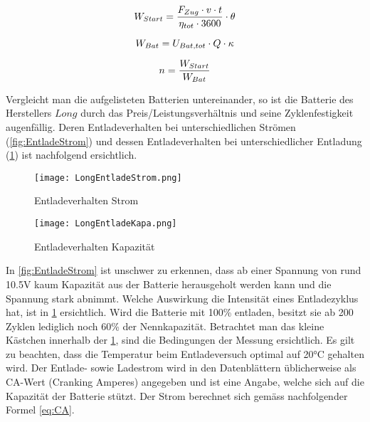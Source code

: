 \begin{equation}
\centering
	W_{Start}=\frac{F_{Zug}\cdot v \cdot t}{\eta_{tot}\cdot 3600}\cdot \theta
\label{eq:EnergieStart}
\end{equation}

\begin{equation}
\centering
	W_{Bat}=U_{Bat,tot}\cdot Q \cdot \kappa
\label{eq:EnergieBatterie}
\end{equation}

\begin{equation}
\centering
	n=\frac{W_{Start}}{W_{Bat}}
\label{eq:AnzahlStarts}
\end{equation}


Vergleicht man die aufgelisteten Batterien untereinander, so ist die Batterie des Herstellers $Long$ durch das Preis/Leistungsverhältnis und seine Zyklenfestigkeit augenfällig. Deren Entladeverhalten bei unterschiedlichen Strömen (\ref{fig:EntladeStrom}) und dessen Entladeverhalten bei unterschiedlicher Entladung (\ref{fig:EntladeKapazität}) ist nachfolgend ersichtlich. 


\begin{figure}[H]
	\centering
	\begin{minipage}[h]{.48\linewidth} %
		\centering
		\texttt{[image: LongEntladeStrom.png]}
		\caption[Batterie Entladeverhalten Strom]{Entladeverhalten Strom}
		\label{fig:EntladeStrom}
	\end{minipage}
	\quad %
	\begin{minipage}[h]{.48\linewidth} %
		\centering
		\texttt{[image: LongEntladeKapa.png]}
		\caption[Batterie Entladeverhalten Kapazität]{Entladeverhalten Kapazität}
		\label{fig:EntladeKapazität}
	\end{minipage}
\end{figure}

In \ref{fig:EntladeStrom} ist unschwer zu erkennen, dass ab einer Spannung von rund 10.5V kaum Kapazität aus der Batterie herausgeholt werden kann und die Spannung stark abnimmt. Welche Auswirkung die Intensität eines Entladezyklus hat, ist in \ref{fig:EntladeKapazität} ersichtlich. Wird die Batterie mit 100\% entladen, besitzt sie ab 200 Zyklen lediglich noch 60\% der Nennkapazität. Betrachtet man das kleine Kästchen innerhalb der \ref{fig:EntladeKapazität}, sind die Bedingungen der Messung ersichtlich. Es gilt zu beachten, dass die Temperatur beim Entladeversuch optimal auf 20°C gehalten wird. Der Entlade- sowie Ladestrom wird in den Datenblättern üblicherweise als CA-Wert (Cranking Amperes) angegeben und ist eine Angabe, welche sich auf die Kapazität der Batterie stützt. Der Strom berechnet sich gemäss nachfolgender Formel \ref{eq:CA}.

